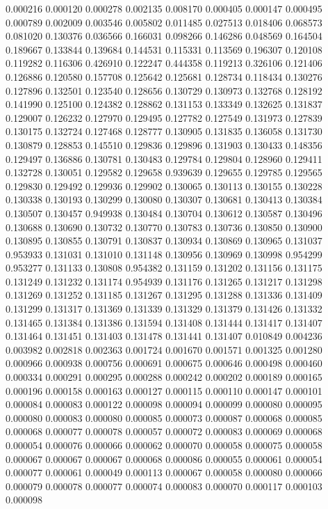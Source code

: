 0.000216
0.000120
0.000278
0.002135
0.008170
0.000405
0.000147
0.000495
0.000789
0.002009
0.003546
0.005802
0.011485
0.027513
0.018406
0.068573
0.081020
0.130376
0.036566
0.166031
0.098266
0.146286
0.048569
0.164504
0.189667
0.133844
0.139684
0.144531
0.115331
0.113569
0.196307
0.120108
0.119282
0.116306
0.426910
0.122247
0.444358
0.119213
0.326106
0.121406
0.126886
0.120580
0.157708
0.125642
0.125681
0.128734
0.118434
0.130276
0.127896
0.132501
0.123540
0.128656
0.130729
0.130973
0.132768
0.128192
0.141990
0.125100
0.124382
0.128862
0.131153
0.133349
0.132625
0.131837
0.129007
0.126232
0.127970
0.129495
0.127782
0.127549
0.131973
0.127839
0.130175
0.132724
0.127468
0.128777
0.130905
0.131835
0.136058
0.131730
0.130879
0.128853
0.145510
0.129836
0.129896
0.131903
0.130433
0.148356
0.129497
0.136886
0.130781
0.130483
0.129784
0.129804
0.128960
0.129411
0.132728
0.130051
0.129582
0.129658
0.939639
0.129655
0.129785
0.129565
0.129830
0.129492
0.129936
0.129902
0.130065
0.130113
0.130155
0.130228
0.130338
0.130193
0.130299
0.130080
0.130307
0.130681
0.130413
0.130384
0.130507
0.130457
0.949938
0.130484
0.130704
0.130612
0.130587
0.130496
0.130688
0.130690
0.130732
0.130770
0.130783
0.130736
0.130850
0.130900
0.130895
0.130855
0.130791
0.130837
0.130934
0.130869
0.130965
0.131037
0.953933
0.131031
0.131010
0.131148
0.130956
0.130969
0.130998
0.954299
0.953277
0.131133
0.130808
0.954382
0.131159
0.131202
0.131156
0.131175
0.131249
0.131232
0.131174
0.954939
0.131176
0.131265
0.131217
0.131298
0.131269
0.131252
0.131185
0.131267
0.131295
0.131288
0.131336
0.131409
0.131299
0.131317
0.131369
0.131339
0.131329
0.131379
0.131426
0.131332
0.131465
0.131384
0.131386
0.131594
0.131408
0.131444
0.131417
0.131407
0.131464
0.131451
0.131403
0.131478
0.131441
0.131407
0.010849
0.004236
0.003982
0.002818
0.002363
0.001724
0.001670
0.001571
0.001325
0.001280
0.000966
0.000938
0.000756
0.000691
0.000675
0.000646
0.000498
0.000460
0.000334
0.000291
0.000295
0.000288
0.000242
0.000202
0.000189
0.000165
0.000196
0.000158
0.000163
0.000127
0.000115
0.000110
0.000147
0.000101
0.000084
0.000083
0.000122
0.000098
0.000094
0.000099
0.000080
0.000095
0.000080
0.000083
0.000080
0.000085
0.000073
0.000087
0.000068
0.000085
0.000068
0.000077
0.000078
0.000057
0.000072
0.000083
0.000069
0.000068
0.000054
0.000076
0.000066
0.000062
0.000070
0.000058
0.000075
0.000058
0.000067
0.000067
0.000067
0.000068
0.000086
0.000055
0.000061
0.000054
0.000077
0.000061
0.000049
0.000113
0.000067
0.000058
0.000080
0.000066
0.000079
0.000078
0.000077
0.000074
0.000083
0.000070
0.000117
0.000103
0.000098

